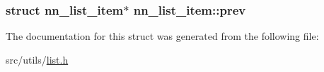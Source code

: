 \subsubsection[{prev}]{\setlength{\rightskip}{0pt plus 5cm}struct {\bf nn\+\_\+list\+\_\+item}$\ast$ nn\+\_\+list\+\_\+item\+::prev}\hypertarget{structnn__list__item_ac6050ca0b2db2385edf95926b9103ea2}{}\label{structnn__list__item_ac6050ca0b2db2385edf95926b9103ea2}


The documentation for this struct was generated from the following file\+:\begin{DoxyCompactItemize}
\item 
src/utils/\hyperlink{list_8h}{list.\+h}\end{DoxyCompactItemize}
